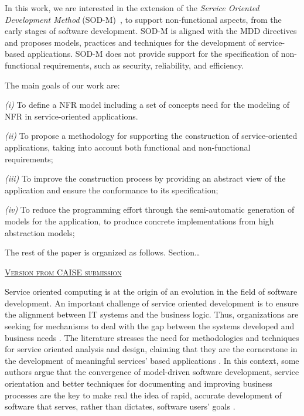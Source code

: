 In this work, we are interested in the extension of the \textit{Service Oriented Development Method} (SOD-M)~\cite{decastro1}, to support non-functional aspects, from the early stages of software development.
SOD-M is aligned with the MDD directives and proposes models, practices and techniques for the development of service-based applications.
SOD-M does not provide support for the specification of non-functional requirements, such as
security, reliability, and efficiency. 

The main goals of our work are:
\begin{trivlist}
\item \textit{(i)} To define a NFR model including a set of concepts need for the modeling of NFR in service-oriented applications.
\item \textit{(ii)} To propose a methodology for supporting the construction of service-oriented applications, taking into account both functional and non-functional requirements;
\item \textit{(iii)} To improve the construction process by providing an abstract view of the application and ensure the conformance to its specification;
\item \textit{(iv)} To reduce the programming effort through the semi-automatic generation of  models for the application, to produce concrete implementations from high abstraction models;
\end{trivlist}

The rest of the paper is organized as follows. 
Section\dots


\begin{center}
\textsc{\underline{Version from CAISE submission}}
\end{center}


Service oriented computing is at the origin of an evolution in the field of software development. 
An important challenge of service oriented development is  to ensure the alignment between IT systems and the business logic.
Thus, organizations are  seeking for mechanisms to deal with the gap between the systems developed and business needs \cite{bell}. The literature stresses the need for methodologies and techniques for service oriented analysis and design, claiming that they are the cornerstone  in the development of meaningful services' based applications \cite{5}.  In this context, some authors argue that the convergence of model-driven software development, service orientation and better techniques for documenting and improving business processes are the key to make real the idea of rapid, accurate development of software that serves, rather than dictates, software users' goals \cite{watson}. 

